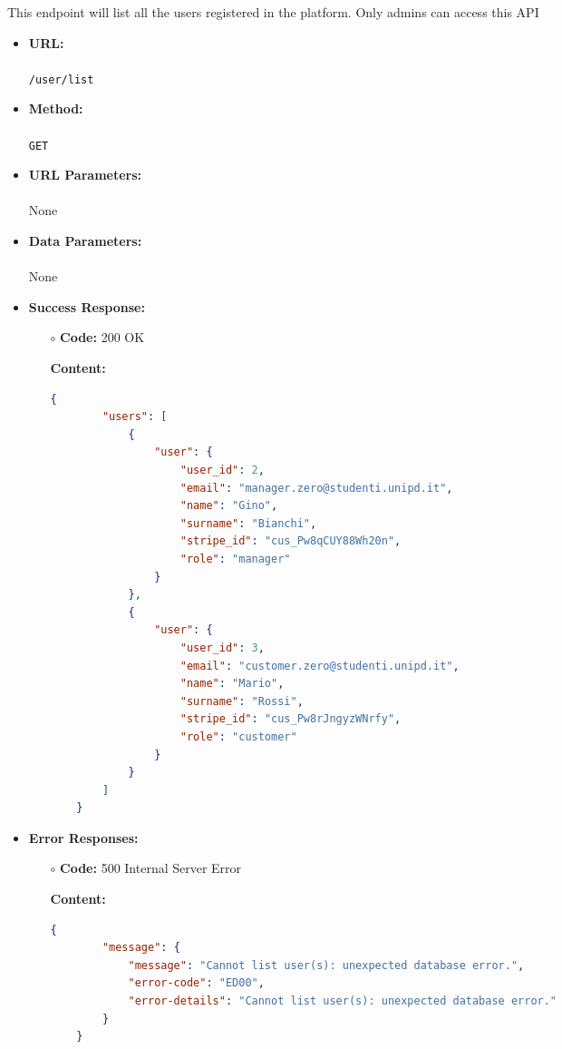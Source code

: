 

This endpoint will list all the users registered in the platform. Only admins can access this API

\begin{itemize}
    \item \textbf{URL:} \\\\\texttt{/user/list}
    \item \textbf{Method:} \\\\\texttt{GET}
    \item \textbf{URL Parameters:} \\\\None
    \item \textbf{Data Parameters:} \\\\None
    \item \textbf{Success Response:}
		\begin{itemize}
			\item[$\circ$] \textbf{Code:} 200 OK
			\item[] \textbf{Content:}
			\begin{lstlisting}[language=json]
    {
        "users": [
            {
                "user": {
                    "user_id": 2,
                    "email": "manager.zero@studenti.unipd.it",
                    "name": "Gino",
                    "surname": "Bianchi",
                    "stripe_id": "cus_Pw8qCUY88Wh20n",
                    "role": "manager"
                }
            },
            {
                "user": {
                    "user_id": 3,
                    "email": "customer.zero@studenti.unipd.it",
                    "name": "Mario",
                    "surname": "Rossi",
                    "stripe_id": "cus_Pw8rJngyzWNrfy",
                    "role": "customer"
                }
            }
        ]
    }
			\end{lstlisting}
		\end{itemize}
	   \item \textbf{Error Responses:}
    	\begin{itemize}
			\item[$\circ$] \textbf{Code:} 500 Internal Server Error
			\item[] \textbf{Content:}
			\begin{lstlisting}[language=json]
    {
        "message": {
            "message": "Cannot list user(s): unexpected database error.",
            "error-code": "ED00",
            "error-details": "Cannot list user(s): unexpected database error."
        }
    }
			\end{lstlisting}
		\end{itemize}	


\end{itemize}
